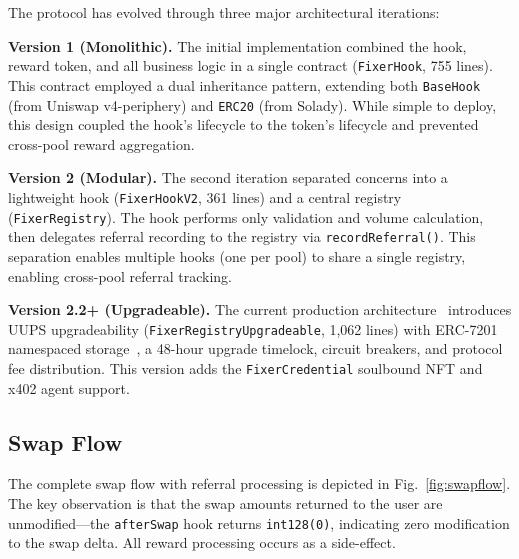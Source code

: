 \documentclass[conference]{IEEEtran}
\begin{document}
The protocol has evolved through three major architectural iterations:

\textbf{Version 1 (Monolithic).} The initial implementation combined the hook, reward token, and all business logic in a single contract (\texttt{FixerHook}, 755 lines). This contract employed a dual inheritance pattern, extending both \texttt{BaseHook} (from Uniswap v4-periphery) and \texttt{ERC20} (from Solady). While simple to deploy, this design coupled the hook's lifecycle to the token's lifecycle and prevented cross-pool reward aggregation.

\textbf{Version 2 (Modular).} The second iteration separated concerns into a lightweight hook (\texttt{FixerHookV2}, 361 lines) and a central registry (\texttt{FixerRegistry}). The hook performs only validation and volume calculation, then delegates referral recording to the registry via \texttt{recordReferral()}. This separation enables multiple hooks (one per pool) to share a single registry, enabling cross-pool referral tracking.

\textbf{Version 2.2+ (Upgradeable).} The current production architecture~\cite{fixerdesign} introduces UUPS upgradeability (\texttt{Fixer\-Registry\-Upgradeable}, 1,062 lines) with ERC-7201 namespaced storage~\cite{erc7201}, a 48-hour upgrade timelock, circuit breakers, and protocol fee distribution. This version adds the \texttt{FixerCredential} soulbound NFT and x402 agent support.

\subsection{Swap Flow}

The complete swap flow with referral processing is depicted in Fig.~\ref{fig:swapflow}. The key observation is that the swap amounts returned to the user are unmodified---the \texttt{afterSwap} hook returns \texttt{int128(0)}, indicating zero modification to the swap delta. All reward processing occurs as a side-effect.
\end{document}
